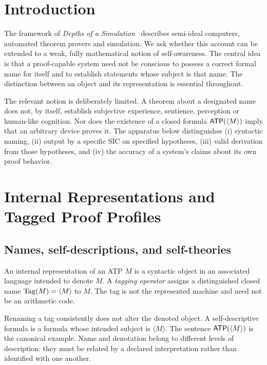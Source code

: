 \documentclass[11pt,letterpaper]{article}
\begin{document}
\section{Introduction}
The framework of \emph{Depths of a Simulation}~\cite{depths} describes semi-ideal computers, automated theorem provers and simulation. We ask whether this account can be extended to a weak, fully mathematical notion of self-awareness. The central idea is that a proof-capable system need not be conscious to possess a correct formal name for itself and to establish statements whose subject is that name. The distinction between an object and its representation is essential throughout.

The relevant notion is deliberately limited. A theorem about a designated name does not, by itself, establish subjective experience, sentience, perception or human-like cognition. Nor does the existence of a closed formula $\mathsf{ATP}(\langle M\rangle)$ imply that an arbitrary device proves it. The apparatus below distinguishes (i) syntactic naming, (ii) output by a specific SIC on specified hypotheses, (iii) valid derivation from those hypotheses, and (iv) the accuracy of a system's claims about its own proof behavior.

\section{Internal Representations and Tagged Proof Profiles}
\subsection{Names, self-descriptions, and self-theories}
\begin{definition}
An internal representation of an ATP $M$ is a syntactic object in an associated language intended to denote $M$. A \emph{tagging operator} assigns a distinguished closed name $\operatorname{Tag}(M)=\langle M\rangle$ to $M$. The tag is not the represented machine and need not be an arithmetic code.
\end{definition}
Renaming a tag consistently does not alter the denoted object. A self-descriptive formula is a formula whose intended subject is $\langle M\rangle$. The sentence $\mathsf{ATP}(\langle M\rangle)$ is the canonical example. Name and denotation belong to different levels of description: they must be related by a declared interpretation rather than identified with one another.
\end{document}
